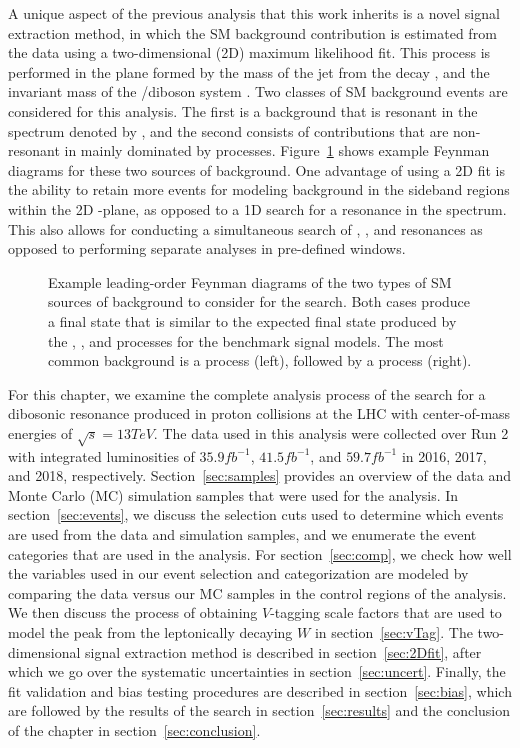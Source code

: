 A unique aspect of the previous analysis that this work inherits is a novel signal extraction method, in which the SM background contribution is estimated from the data using a two-dimensional (2D) maximum likelihood fit.
This process is performed in the plane formed by the mass of the jet from the \VorH decay \MJ, and the invariant mass of the \WV/\WH diboson system \MVV.
Two classes of SM background events are considered for this analysis.
The first is a background that is resonant in the \MJ spectrum denoted by \WVt, and the second consists of contributions that are non-resonant in \MJ mainly dominated by \Wjets processes.
Figure~\ref{fig:bkgFeynman} shows example Feynman diagrams for these two sources of background.
One advantage of using a 2D fit is the ability to retain more events for modeling background in the sideband regions within the 2D \MJ-\MVV plane, as opposed to a 1D search for a resonance in the \MVV spectrum.
This also allows for conducting a simultaneous search of \WW, \WZ, and \WH resonances as opposed to performing separate analyses in pre-defined \MJ windows.

\begin{figure}[htbp]
  \centering
  
  \caption{
    Example leading-order Feynman diagrams of the two types of SM sources of background to consider for the search.
    Both cases produce a final state that is similar to the expected final state produced by the \ggF, \DY, and \VBF processes for the benchmark signal models.
    The most common background is a \Wjets process (left), followed by a \WVt process (right).
  }
  \label{fig:bkgFeynman}
\end{figure}

For this chapter, we examine the complete analysis process of the search for a dibosonic resonance produced in proton collisions at the LHC with center-of-mass energies of $\sqrt{s}=13\unit{TeV}$.
The data used in this analysis were collected over Run 2 with integrated luminosities of $35.9\unit{fb^{-1}}$, $41.5\unit{fb^{-1}}$, and $59.7\unit{fb^{-1}}$ in 2016, 2017, and 2018, respectively.
Section~\ref{sec:samples} provides an overview of the data and Monte Carlo (MC) simulation samples that were used for the analysis.
In section~\ref{sec:events}, we discuss the selection cuts used to determine which events are used from the data and simulation samples, and we enumerate the event categories that are used in the analysis.
For section~\ref{sec:comp}, we check how well the variables used in our event selection and categorization are modeled by comparing the data versus our MC samples in the control regions of the analysis.
We then discuss the process of obtaining $V$-tagging scale factors that are used to model the peak from the leptonically decaying $W$ in section~\ref{sec:vTag}.
The two-dimensional signal extraction method is described in section~\ref{sec:2Dfit}, after which we go over the systematic uncertainties in section~\ref{sec:uncert}.
Finally, the fit validation and bias testing procedures are described in section~\ref{sec:bias}, which are followed by the results of the search in section~\ref{sec:results} and the conclusion of the chapter in section~\ref{sec:conclusion}.
